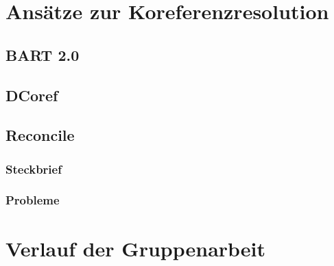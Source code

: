 \documentclass[a4paper,12pt,titlepage=true, ngerman]{scrartcl}
\begin{document}
\newpage

\section{Ansätze zur Koreferenzresolution}\label{Ansätze zur Koreferenzresolution} %



\subsection{BART 2.0}





\subsection{DCoref}





\subsection{Reconcile} %



\subsubsection{Steckbrief} %



\subsubsection{Probleme} %



\newpage

\section{Verlauf der Gruppenarbeit}\label{Verlauf der Gruppenarbeit} %
\end{document}
